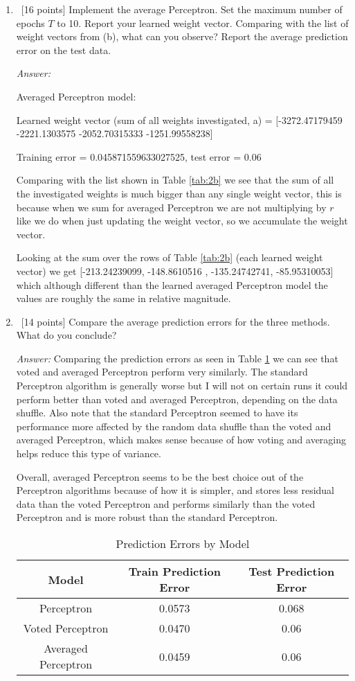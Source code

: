\documentclass[12pt, fullpage,letterpaper]{article}
\begin{document}
\begin{enumerate}
\begin{enumerate}
	\item~[16 points] Implement the average Perceptron. Set the maximum number of epochs $T$ to 10. Report your learned weight vector. Comparing with the list of weight vectors from (b), what can you observe? Report the average prediction error on the test data. 

	\textit{Answer:}

	Averaged Perceptron model:

	Learned weight vector (sum of all weights investigated, a) = [-3272.47179459 -2221.1303575  -2052.70315333 -1251.99558238]

	Training error = 0.045871559633027525, test error = 0.06

	Comparing with the list shown in Table \ref{tab:2b} we see that the sum of all the investigated weights is much bigger than any single weight vector, this is because when we sum for averaged Perceptron we are not multiplying by $r$ like we do when just updating the weight vector, so we accumulate the weight vector. 
	
	Looking at the sum over the rows of Table \ref{tab:2b} (each learned weight vector) we get [-213.24239099, -148.8610516 , -135.24742741,  -85.95310053] which although different than the learned averaged Perceptron model the values are roughly the same in relative magnitude.


	\item~[14 points] Compare the average prediction errors for the three methods. What do you conclude? 

	\textit{Answer:}
	Comparing the prediction errors as seen in Table \ref{tab:2d} we can see that voted and averaged Perceptron perform very similarly. 
	The standard Perceptron algorithm is generally worse but I will not on certain runs it could perform better than voted and averaged Perceptron, depending on the data shuffle. 
	Also note that the standard Perceptron seemed to have its performance more affected by the random data shuffle than the voted and averaged Perceptron, which makes sense because of how voting and averaging helps reduce this type of variance.

	Overall, averaged Perceptron seems to be the best choice out of the Perceptron algorithms because of how it is simpler, and stores less residual data than the voted Perceptron and performs similarly than the voted Perceptron and is more robust than the standard Perceptron.

	\begin{center}
	\begin{longtable}{|c|c|c|}
		\caption{Prediction Errors by Model}
		\label{tab:2d}\\
		\hline
		Model & Train Prediction Error & Test Prediction Error \\
		\hline
		Perceptron & 0.0573 & 0.068 \\
		\hline
		Voted Perceptron & 0.0470 & 0.06 \\
		\hline
		Averaged Perceptron & 0.0459 & 0.06 \\ 
		\hline
	\end{longtable}
	\end{center}


\end{enumerate}
\end{enumerate}
\end{document}
